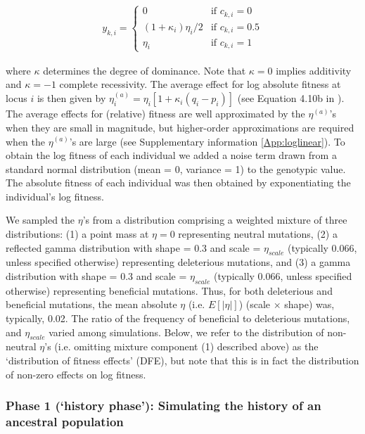 \documentclass[12pt]{article}
\begin{document}
\begin{bibunit}
\begin{equation}
\begin{array}{rl}

y_{k,i} =

\begin{cases}
    0 & \text{if } c_{k,i} = 0 \\
    (1 + {\kappa}_i)\eta_i/2 & \text{if } c_{k,i} = 0.5 \\
    \eta_i & \text{if } c_{k,i} = 1
\end{cases}

\end{array} 
\end{equation}

where $\kappa$ determines the degree of dominance. Note that $\kappa=0$ implies additivity and $\kappa=-1$ complete recessivity. The average effect for log absolute fitness at locus $i$ is then given by $\eta_i^{(a)} = \eta_i[1 + {\kappa}_i(q_i - p_i)]$ (see Equation 4.10b in \citet{lynch1998}). The average effects for (relative) fitness are well approximated by the $\eta^{(a)}$'s when they are small in magnitude, but higher-order approximations are required when the $\eta^{(a)}$'s are large (see Supplementary information \ref{App:loglinear}). To obtain the log fitness of each individual we added a noise term drawn from a standard normal distribution (mean = 0, variance = 1) to the genotypic value.  The absolute fitness of each individual was then obtained by exponentiating the individual's log fitness.  

We sampled the $\eta$'s from a distribution comprising a weighted mixture of three distributions: (1) a point mass at $\eta = 0$ representing neutral mutations, (2) a reflected gamma distribution with shape = 0.3 and scale = $\eta_{scale}$ (typically 0.066, unless specified otherwise) representing deleterious mutations, and (3) a gamma distribution with shape = 0.3 and scale = $\eta_{scale}$ (typically 0.066, unless specified otherwise) representing beneficial mutations. Thus, for both deleterious and beneficial mutations, the mean absolute $\eta$ (i.e. $E[|\eta|]$) (scale $\times$ shape) was, typically, 0.02. The ratio of the frequency of beneficial to deleterious mutations, and $\eta_{scale}$ varied among simulations. Below, we refer to the distribution of non-neutral $\eta$'s (i.e. omitting mixture component (1) described above) as the `distribution of fitness effects' (DFE), but note that this is in fact the distribution of non-zero effects on log fitness.

\subsubsection*{Phase 1 (`history phase'): Simulating the history of an ancestral population}


\end{bibunit}
\end{document}

